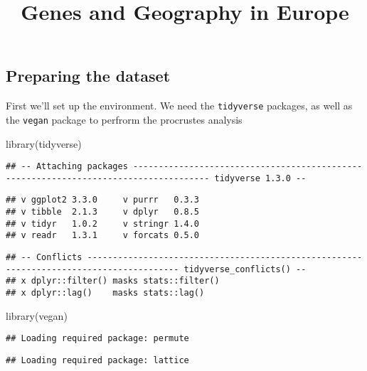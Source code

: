\documentclass[
]{article}
\title{Genes and Geography in Europe}
\author{}
\date{\vspace{-2.5em}}
\newenvironment{Shaded}{\begin{snugshade}}{\end{snugshade}}
\newcommand{\FunctionTok}[1]{\textcolor[rgb]{0.00,0.00,0.00}{#1}}
\newcommand{\NormalTok}[1]{#1}
\begin{document}
\maketitle

\hypertarget{preparing-the-dataset}{%
\subsection{Preparing the dataset}\label{preparing-the-dataset}}

First we'll set up the environment. We need the \texttt{tidyverse}
packages, as well as the \texttt{vegan} package to perfrorm the
procrustes analysis

\begin{Shaded}
\begin{Highlighting}[]
\FunctionTok{library}\NormalTok{(tidyverse)}
\end{Highlighting}
\end{Shaded}

\begin{verbatim}
## -- Attaching packages ------------------------------------------------------------------------------------- tidyverse 1.3.0 --
\end{verbatim}

\begin{verbatim}
## v ggplot2 3.3.0     v purrr   0.3.3
## v tibble  2.1.3     v dplyr   0.8.5
## v tidyr   1.0.2     v stringr 1.4.0
## v readr   1.3.1     v forcats 0.5.0
\end{verbatim}

\begin{verbatim}
## -- Conflicts ---------------------------------------------------------------------------------------- tidyverse_conflicts() --
## x dplyr::filter() masks stats::filter()
## x dplyr::lag()    masks stats::lag()
\end{verbatim}

\begin{Shaded}
\begin{Highlighting}[]
\FunctionTok{library}\NormalTok{(vegan)}
\end{Highlighting}
\end{Shaded}

\begin{verbatim}
## Loading required package: permute
\end{verbatim}

\begin{verbatim}
## Loading required package: lattice
\end{verbatim}
\end{document}
